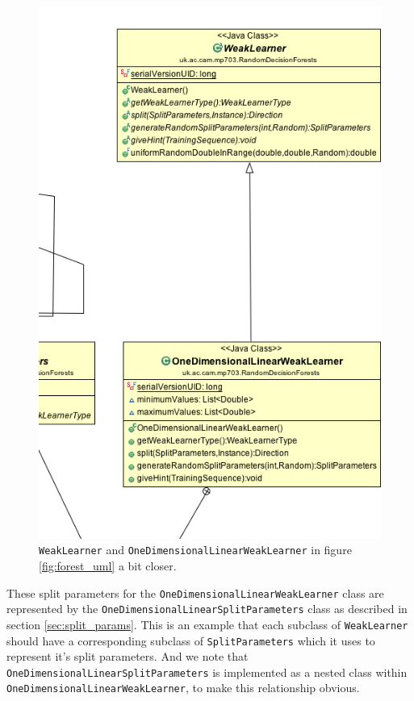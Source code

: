 \documentclass[12pt,twoside,notitlepage]{report}
\begin{document}
                \begin{figure}[H]
                    \centering
                    \includegraphics[scale=0.5]{WeakLearner_Forest_UML}
                    \caption{\texttt{WeakLearner} and \texttt{OneDimensionalLinearWeakLearner} in figure \ref{fig:forest_uml} a bit closer.}
                    \label{fig:weak_learner_uml}
                \end{figure}

                These split parameters for the \texttt{OneDimensionalLinearWeakLearner} class are represented by the 
                \texttt{OneDimensionalLinearSplitParameters} class as described in section \ref{sec:split_params}. This 
                is an example that each subclass of \texttt{WeakLearner} should have a corresponding subclass of 
                \texttt{SplitParameters} which it uses to represent it's split parameters. And we note that 
                \texttt{OneDimensionalLinearSplitParameters} is implemented as a nested class within 
                \texttt{OneDimensionalLinearWeakLearner}, to make this relationship obvious.
\end{document}
